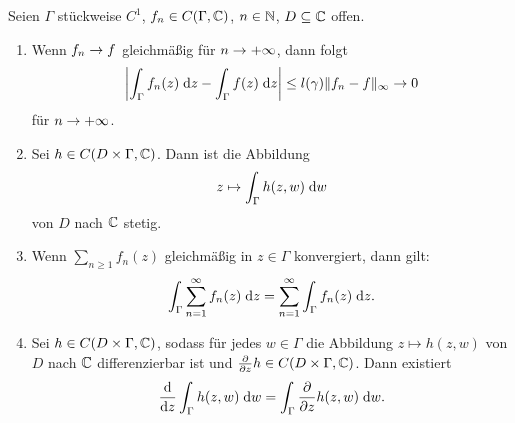 \documentclass[a4paper,twoside,DIV15,BCOR12mm]{scrbook}
\begin{document}
\begin{satz}\label{satz2.7}
Seien $\Gamma$ stückweise $C^1$, $f_n\in C(\Gamma,\mathbb{C})$, $n\in\mathbb{N}$, $D\subseteq\mathbb{C}$ offen.
\begin{enumerate}
\item Wenn $f_n\rightarrow f$ gleichmäßig für $n\rightarrow+\infty$, dann folgt
\[\left|\int_{\Gamma}^{}{f_n(z)}\;\mathrm{d} z-\int_{\Gamma}^{}{f(z)}\;\mathrm{d} z\right| \leq l(\gamma) \|f_n-f\|_\infty\rightarrow 0\]
für $n\rightarrow+\infty$.

\item Sei $h\in C(D\times\Gamma,\mathbb{C})$. Dann ist die Abbildung
\[z\mapsto\int_{\Gamma}^{}{h(z,w)}\;\mathrm{d} w\]
von $D$ nach $\mathbb{C}$ stetig.

\item Wenn $\displaystyle\sum_{n\geq1}f_n(z)$ gleichmäßig in $z\in\Gamma$ konvergiert, dann gilt:
\[\int_{\Gamma}^{}{\sum_{n=1}^\infty f_n(z)}\;\mathrm{d} z = \sum_{n=1}^\infty\int_{\Gamma}^{}{f_n(z)}\;\mathrm{d} z.\]

\item Sei $h\in C(D\times\Gamma,\mathbb{C})$, sodass für jedes $w\in\Gamma$ die Abbildung $z\mapsto h(z,w)$ von $D$ nach $\mathbb{C}$ differenzierbar ist und $\frac{\partial}{\partial z}h\in C(D\times\Gamma,\mathbb{C})$. Dann existiert
\[\frac{\mathrm{d}}{\mathrm{d}z}\int_{\Gamma}^{}{h(z,w)}\;\mathrm{d} w = \int_{\Gamma}^{}{\frac{\partial}{\partial z}h(z,w)}\;\mathrm{d} w.\]
\end{enumerate}
\end{satz}
\end{document}
